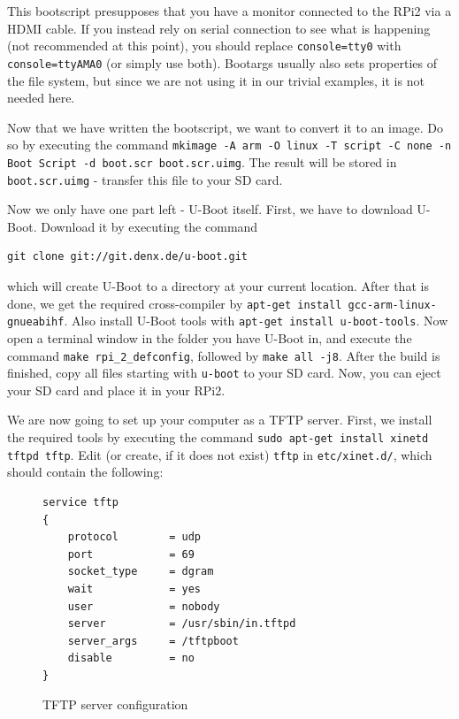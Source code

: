 \documentclass[a4paper,11pt,reqno]{amsart}
\begin{document}
{This bootscript presupposes that you have a monitor connected to the RPi2 via a HDMI cable. If you instead rely on serial connection to see what is happening (not recommended at this point), you should replace \texttt{console=tty0} with \texttt{console=ttyAMA0} (or simply use both). Bootargs usually also sets properties of the file system, but since we are not using it in our trivial examples, it is not needed here.

Now that we have written the bootscript, we want to convert it to an image. Do so by executing the command \texttt{mkimage -A arm -O linux -T script -C none -n Boot Script -d boot.scr boot.scr.uimg}. The result will be stored in \texttt{boot.scr.uimg} - transfer this file to your SD card.

Now we only have one part left - U-Boot itself. First, we have to download U-Boot. Download it by executing the command

\begin{verbatim}
git clone git://git.denx.de/u-boot.git
\end{verbatim}

which will create U-Boot to a directory at your current location. After that is done, we get the required cross-compiler by \texttt{apt-get install gcc-arm-linux-gnueabihf}. Also install U-Boot tools with \texttt{apt-get install u-boot-tools}. Now open a terminal window in the folder you have U-Boot in, and execute the command \texttt{make rpi\_2\_defconfig}, followed by \texttt{make all -j8}. After the build is finished, copy all files starting with \texttt{u-boot} to your SD card. Now, you can eject your SD card and place it in your RPi2.

We are now going to set up your computer as a TFTP server. First, we install the required tools by executing the command \texttt{sudo apt-get install xinetd tftpd tftp}. Edit (or create, if it does not exist) \texttt{tftp} in \texttt{etc/xinet.d/}, which should contain the following:

\begin{figure}[hb]
\begin{center}
\begin{BVerbatim}
service tftp
{
    protocol        = udp
    port            = 69
    socket_type     = dgram
    wait            = yes
    user            = nobody
    server          = /usr/sbin/in.tftpd
    server_args     = /tftpboot
    disable         = no
}
\end{BVerbatim}
\end{center}
\caption{TFTP server configuration}
\label{fig:server}
\end{figure}

}
\end{document}
